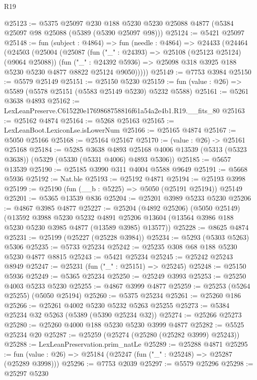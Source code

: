 \begin{lexlean}{R19}
\begin{coremodule}
@25123 := @5375
    @25097
    @230
    @188
    @5230
    @5230
    @25088
    @4877
    (@5384 @25097 @98 @25088 (@5389 (@5390 @25097 @98)))
@25124 := @5421 @25097
@25148 := fun (subject : @4864) =>
  fun (needle : @4864) =>
  @24433
    (@24464
      (@24503
        (@25004
          (@25087
            (fun ("_" : @24393) => @25108 (@25123 @25124) (@9064 @25088))
            (fun ("_" : @24392 @5936) =>
            @25098 @318 @3925 @188 @5230 @5230 @4877 @8822 @25124 @9050)))))
@25149 := @7753 @3984
@25150 := @5579 @25149
@25151 := @25150 @5230
@25159 := fun (value : @26) => @5589 (@5578 @25151 (@5583 @25149 @5230) @5232 @5588)
@25161 := @5261 @3638 @4893
@25162 := LexLeanPreserve.C615220e1769868758816f61a54a2e4b1.R19.__fits_80
@25163 := @25162 @4874
@25164 := @5268 @25163
@25165 := LexLeanBoot.LexiconLse.isLowerNum
@25166 := @25165 @4874
@25167 := @5050 @25166
@25168 := @25164 @25167
@25170 := (value : @26) -> @25161 @25168
@25184 := @5285
    @3638
    @4893
    @25168
    @4006
    @13539
    (@5313 (@5323 @3638))
    (@5329 (@5330 (@5331 @4006) @4893 @5306))
@25185 := @5657 @13539
@25190 := @25185 @3990 @311 @4004 @5588 @9649
@25191 := @5668 @5936
@25192 := Nat.ble
@25193 := @25192 @4871
@25194 := @25193 @3998
@25199 := @25190 (fun (__b : @5225) => @5050 (@25191 @25194)) @25149
@25201 := @5365 @13539 @836
@25204 := @25201 @3989 @5233 @5230
@25206 := @4867 @3985 @4877
@25227 := @25204
    (@4892 @25206)
    (@5050 @25149)
    (@13592
      @3988
      @5230
      @5232
      @4891
      @25206
      @13604
      (@13564 @3986 @188 @5230 @5230 @3985 @4877 (@13589 @3985) @13577))
@25228 := @8625 @4874
@25231 := @25199 (@25227 (@25228 @3984))
@25234 := @5293 (@5303 @5263) @5306
@25235 := @5733 @25234
@25242 := @25235 @308 @68 @188 @5230 @5230 @4877 @8815
@25243 := @5421 @25234
@25245 := @25242 @25243 @8949
@25247 := @25231 (fun ("_" : @25151) => @25245)
@25248 := @25150 @5936
@25249 := @5365 @25234
@25250 := @25249 @3993
@25253 := @25250 @4003 @5233 @5230
@25255 := @4867 @3999 @4877
@25259 := @25253 (@5264 @25255) (@5050 @25194)
@25260 := @5375 @25234
@25261 := @25260 @186
@25266 := @25261 @4002 @5230 @5232 @5263 @25255
@25273 := @5384 @25234 @32 @5263 (@5389 (@5390 @25234 @32))
@25274 := @25266 @25273
@25280 := @25260 @4000 @188 @5230 @5230 @3999 @4877
@25282 := @5525 @25234 @20
@25287 := @25259 (@25274 (@25280 (@25282 @3999) @25243))
@25288 := LexLeanPreservation.prim_natLe
@25289 := @25288 @4871
@25295 := fun (value : @26) => @25184 (@25247 (fun ("_" : @25248) => @25287 (@25289 @3998)))
@25296 := @7753 @2039
@25297 := @5579 @25296
@25298 := @25297 @5230

\end{coremodule}
\end{lexlean}
